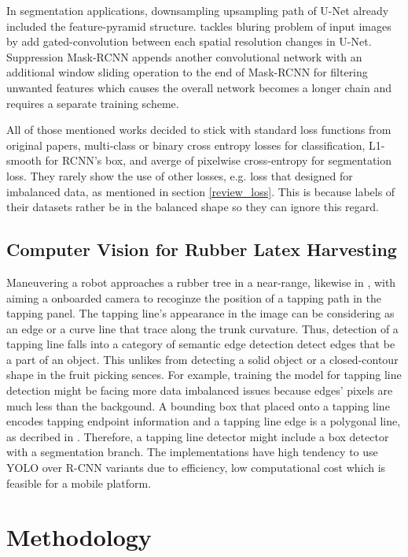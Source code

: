 \documentclass[default,pdflatex,iicol]{sn-jnl}%
\begin{document}
In segmentation applications, downsampling upsampling path of U-Net already included the feature-pyramid structure. \cite{Li2021apple} tackles bluring problem of input images by add gated-convolution between each spatial resolution changes in U-Net. Suppression Mask-RCNN \cite{Chu2021apple} appends another convolutional network with an additional window sliding operation to the end of Mask-RCNN for filtering unwanted features which causes the overall network becomes a longer chain and requires a separate training scheme.

All of those mentioned works decided to stick with standard loss functions from original papers, multi-class or binary cross entropy losses for classification, L1-smooth for RCNN's box, and averge of pixelwise cross-entropy for segmentation loss. They rarely show the use of other losses, e.g. loss that designed for imbalanced data, as mentioned in section \ref{review_loss}. This is because labels of their datasets rather be in the balanced shape so they can ignore this regard.

\subsection{Computer Vision for Rubber Latex Harvesting}
Maneuvering a robot approaches a rubber tree in a near-range, likewise in \cite{zhang2019rubber, WANG2022103906}, with aiming a onboarded camera to recoginze the position of a tapping path in the tapping panel. The tapping line's appearance in the image can be considering as an edge or a curve line that trace along the trunk curvature. Thus, detection of a tapping line falls into a category of semantic edge detection \textemdash detect edges that be a part of an object. This unlikes from detecting a solid object or a closed-contour shape in the fruit picking sences. For example, training the model for tapping line detection might be facing more data imbalanced issues because edges' pixels are much less than the backgound. A bounding box that placed onto a tapping line encodes tapping endpoint information and a tapping line edge is a polygonal line, as decribed in \cite{Wongtanawijit_2021}. Therefore, a tapping line detector might include a box detector with a segmentation branch. The implementations have high tendency to use YOLO over R-CNN variants due to efficiency, low computational cost which is feasible for a mobile platform.


\section{Methodology}\label{sec-methodology}
\end{document}
